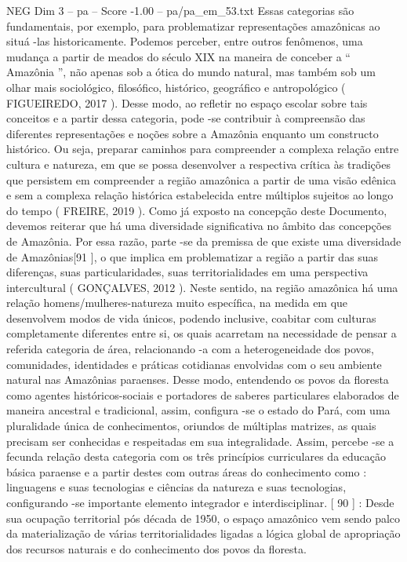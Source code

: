 \begin{textsample}{NEG Dim 3 – pa – Score -1.00 – pa/pa\_em\_53.txt}
Essas categorias são fundamentais, por exemplo, para problematizar representações amazônicas ao situá -las historicamente.
Podemos perceber, entre outros fenômenos, uma mudança a partir de meados do século XIX na maneira de conceber a “ Amazônia ”, não apenas sob a ótica do mundo natural, mas também sob um olhar mais sociológico, filosófico, histórico, geográfico e antropológico ( FIGUEIREDO, 2017 ).
Desse modo, ao refletir no espaço escolar sobre tais conceitos e a partir dessa categoria, pode -se contribuir à compreensão das diferentes representações e noções sobre a Amazônia enquanto um constructo histórico.
Ou seja, preparar caminhos para compreender a complexa relação entre cultura e natureza, em que se possa desenvolver a respectiva crítica às tradições que persistem em compreender a região amazônica a partir de uma visão edênica e sem a complexa relação histórica estabelecida entre múltiplos sujeitos ao longo do tempo ( FREIRE, 2019 ).
Como já exposto na concepção deste Documento, devemos reiterar que há uma diversidade significativa no âmbito das concepções de Amazônia.
Por essa razão, parte -se da premissa de que existe uma diversidade de Amazônias[91 ], o que implica em problematizar a região a partir das suas diferenças, suas particularidades, suas territorialidades em uma perspectiva intercultural ( GONÇALVES, 2012 ).
Neste sentido, na região amazônica há uma relação homens/mulheres-natureza muito específica, na medida em que desenvolvem modos de vida únicos, podendo inclusive, coabitar com culturas completamente diferentes entre si, os quais acarretam na necessidade de pensar a referida categoria de área, relacionando -a com a heterogeneidade dos povos, comunidades, identidades e práticas cotidianas envolvidas com o seu ambiente natural nas Amazônias paraenses.
Desse modo, entendendo os povos da floresta como agentes históricos-sociais e portadores de saberes particulares elaborados de maneira ancestral e tradicional, assim, configura -se o estado do Pará, com uma pluralidade única de conhecimentos, oriundos de múltiplas matrizes, as quais precisam ser conhecidas e respeitadas em sua integralidade.
Assim, percebe -se a fecunda relação desta categoria com os três princípios curriculares da educação básica paraense e a partir destes com outras áreas do conhecimento como : linguagens e suas tecnologias e ciências da natureza e suas tecnologias, configurando -se importante elemento integrador e interdisciplinar. [ 90 ] : Desde sua ocupação territorial pós década de 1950, o espaço amazônico vem sendo palco da materialização de várias territorialidades ligadas a lógica global de apropriação dos recursos naturais e do conhecimento dos povos da floresta.

\end{textsample}
